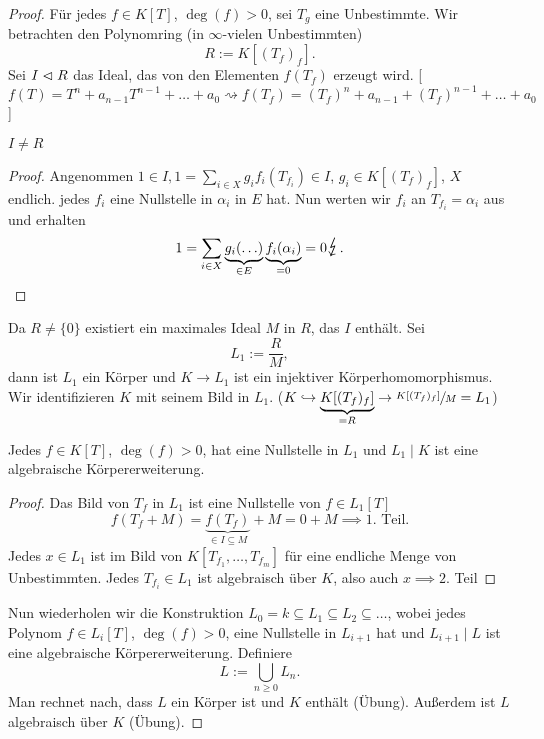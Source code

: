 \begin{proof}
		Für jedes $f \in K[T]$, $\deg(f) > 0$, sei $T_{g}$ eine Unbestimmte. 
		Wir betrachten den Polynomring (in $\infty$-vielen Unbestimmten)
		\[
			R := K[(T_{f})_{f}]
		.\] 
		Sei $I \vartriangleleft R$ das Ideal, das von den Elementen $f(T_{f})$ erzeugt wird.
		[$f(T) = T^{n} + a_{n-1} T^{n-1} + \ldots + a_0 \rightsquigarrow f(T_{f}) = (T_{f})^{n} + a_{n-1} + (T_{f})^{n-1} + \ldots + a_0$ ]

		\begin{claim}
			$I \neq R$
		\end{claim}
		
		\begin{proof}
			Angenommen $1 \in I, 1 = \sum_{i \in X} g_{i} f_{i}(T_{f_{i}}) \in I$, $g_{i} \in K[(T_{f})_{f}]$, $X$ endlich.
			jedes $f_{i}$ eine Nullstelle in $\alpha_{i}$ in $E$ hat. Nun werten wir $f_{i}$ an $T_{f_{i}} = \alpha_{i}$ aus
			und erhalten 
			\[
				1 = \sum_{i \in X} \underbrace{g_{i}(\ldots)}_{\in E} \underbrace{f_{i}(\alpha_{i})}_{=0} = 0 \contra
			.\] 
		\end{proof}
		Da $R \neq \{0\} $ existiert ein maximales Ideal $M$ in $R$, das $I$ enthält. Sei
		\[
		L_1 := \frac{R}{M}
		,\] 
		dann ist $L_1$ ein Körper und $K \to L_1$ ist ein injektiver Körperhomomorphismus.
		Wir identifizieren $K$ mit seinem Bild in $L_1$. ($K \hookrightarrow \underbrace{K[(T_{f})_{f}]}_{=R} \to \sfrac{K[(T_{f})_{f}]}{M} = L_1$)

		\begin{claim}
			Jedes $f \in K[T]$, $\deg(f) > 0$, hat eine Nullstelle in $L_1$ und $L_1 \mid K$ ist eine algebraische Körpererweiterung.
		\end{claim}

		\begin{proof}
			Das Bild von $T_{f}$ in $L_1$ ist eine Nullstelle von $f \in L_1[T]$ 
			\[
				f(T_{f} + M) = \underbrace{f(T_{f})}_{\in I \subseteq M} + M = 0 + M \implies 1. \text{ Teil}
			.\] 
			Jedes $x \in L_1$ ist im Bild von $K[T_{f_1},\ldots,T_{f_{m}}]$ für eine endliche Menge von Unbestimmten.
			Jedes $T_{f_i} \in L_1$ ist algebraisch über $K$, also auch $x \implies 2.$  Teil
		\end{proof}

		Nun wiederholen wir die Konstruktion $L_0 = k \subseteq L_1 \subseteq L_2 \subseteq \ldots$, wobei jedes Polynom $f \in L_{i}[T]$,
		$\deg(f) > 0$, eine Nullstelle in $L_{i+1}$ hat und $L_{i+1} \mid L$ ist eine algebraische Körpererweiterung.
		Definiere
		\[
		L := \bigcup_{n \geq 0}  L_{n}
		.\] 
		Man rechnet nach, dass $L$ ein Körper ist und $K$ enthält (Übung).
		Außerdem ist $L$ algebraisch über $K$ (Übung).


\end{proof}
